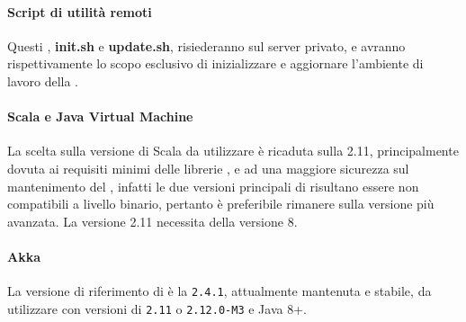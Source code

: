 \documentclass{scalatekids-article}
\begin{document}
\paragraph{Script di utilità remoti}

Questi , \textbf{init.sh} e \textbf{update.sh}, risiederanno sul server
privato, e avranno rispettivamente lo scopo esclusivo di inizializzare e
aggiornare l'ambiente di lavoro della .

\paragraph{Scala e Java Virtual Machine}

La scelta sulla versione di Scala da utilizzare è ricaduta sulla 
2.11, principalmente dovuta ai requisiti minimi delle librerie \textit{}, e
ad una maggiore sicurezza sul mantenimento del , infatti le due versioni
principali di  risultano essere non compatibili a livello binario,
pertanto è preferibile rimanere sulla versione più avanzata. La versione 2.11
necessita della  versione 8.

\paragraph{Akka}

La versione di riferimento di  è la \verb=2.4.1=, attualmente
mantenuta e stabile, da utilizzare con versioni di  \verb=2.11= o
\verb=2.12.0-M3= e Java 8+.

\appendix

\listoffigures
\end{document}
